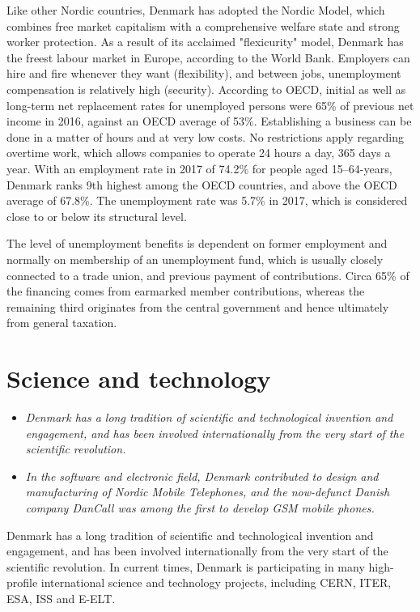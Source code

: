 Like other Nordic countries, Denmark has adopted the Nordic Model, which
combines free market capitalism with a comprehensive welfare state and
strong worker protection. As a result of its acclaimed "flexicurity"
model, Denmark has the freest labour market in Europe, according to the
World Bank. Employers can hire and fire whenever they want
(flexibility), and between jobs, unemployment compensation is relatively
high (security). According to OECD, initial as well as long-term net
replacement rates for unemployed persons were 65\% of previous net
income in 2016, against an OECD average of 53\%. Establishing a business
can be done in a matter of hours and at very low costs. No restrictions
apply regarding overtime work, which allows companies to operate 24
hours a day, 365 days a year. With an employment rate in 2017 of 74.2\%
for people aged 15--64-years, Denmark ranks 9th highest among the OECD
countries, and above the OECD average of 67.8\%. The unemployment rate
was 5.7\% in 2017, which is considered close to or below its structural
level.

The level of unemployment benefits is dependent on former employment and
normally on membership of an unemployment fund, which is usually closely
connected to a trade union, and previous payment of contributions. Circa
65\% of the financing comes from earmarked member contributions, whereas
the remaining third originates from the central government and hence
ultimately from general taxation.

\section{Science and technology}\label{science-and-technology}

\begin{itemize}
\item
  \emph{Denmark has a long tradition of scientific and technological
  invention and engagement, and has been involved internationally from
  the very start of the scientific revolution.}
\item
  \emph{In the software and electronic field, Denmark contributed to
  design and manufacturing of Nordic Mobile Telephones, and the
  now-defunct Danish company DanCall was among the first to develop GSM
  mobile phones.}
\end{itemize}

Denmark has a long tradition of scientific and technological invention
and engagement, and has been involved internationally from the very
start of the scientific revolution. In current times, Denmark is
participating in many high-profile international science and technology
projects, including CERN, ITER, ESA, ISS and E-ELT.

